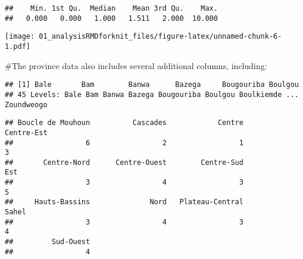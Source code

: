 \documentclass[]{article}
\newenvironment{Shaded}{\begin{snugshade}}{\end{snugshade}}
\newcommand{\CommentTok}[1]{\textcolor[rgb]{0.56,0.35,0.01}{\textit{#1}}}
\newcommand{\KeywordTok}[1]{\textcolor[rgb]{0.13,0.29,0.53}{\textbf{#1}}}
\newcommand{\NormalTok}[1]{#1}
\newcommand{\OperatorTok}[1]{\textcolor[rgb]{0.81,0.36,0.00}{\textbf{#1}}}
\begin{document}
\begin{verbatim}
##    Min. 1st Qu.  Median    Mean 3rd Qu.    Max. 
##   0.000   0.000   1.000   1.511   2.000  10.000
\end{verbatim}

\begin{Shaded}
\end{Shaded}

\texttt{[image: 01\_analysisRMDforknit\_files/figure-latex/unnamed-chunk-6-1.pdf]}

\#The province data also includes several additional columns, including:

\begin{Shaded}
\end{Shaded}

\begin{verbatim}
## [1] Bale       Bam        Banwa      Bazega     Bougouriba Boulgou   
## 45 Levels: Bale Bam Banwa Bazega Bougouriba Boulgou Boulkiemde ... Zoundweogo
\end{verbatim}

\begin{Shaded}
\end{Shaded}

\begin{verbatim}
## Boucle de Mouhoun          Cascades            Centre        Centre-Est 
##                 6                 2                 1                 3 
##       Centre-Nord      Centre-Ouest        Centre-Sud               Est 
##                 3                 4                 3                 5 
##     Hauts-Bassins              Nord   Plateau-Central             Sahel 
##                 3                 4                 3                 4 
##         Sud-Ouest 
##                 4
\end{verbatim}
\end{document}
